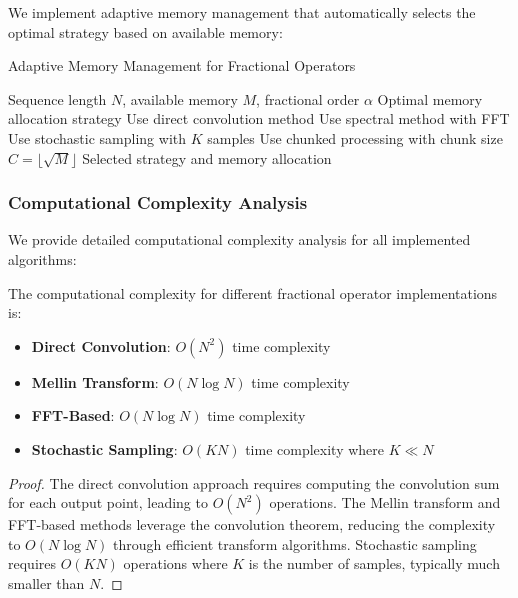 We implement adaptive memory management that automatically selects the optimal strategy based on available memory:

\begin{algorithm}[h]
\caption{Adaptive Memory Management for Fractional Operators}
\begin{algorithmic}[1]
\Require Sequence length $N$, available memory $M$, fractional order $\alpha$
\Ensure Optimal memory allocation strategy
    \State Use direct convolution method
    \State Use spectral method with FFT
    \State Use stochastic sampling with $K$ samples
\Else
    \State Use chunked processing with chunk size $C = \lfloor \sqrt{M} \rfloor$
\EndIf
\Return Selected strategy and memory allocation
\end{algorithmic}
\end{algorithm}

\subsubsection{Computational Complexity Analysis}

We provide detailed computational complexity analysis for all implemented algorithms:

\begin{theorem}
The computational complexity for different fractional operator implementations is:
\begin{itemize}
\item \textbf{Direct Convolution}: $O(N^2)$ time complexity
\item \textbf{Mellin Transform}: $O(N \log N)$ time complexity
\item \textbf{FFT-Based}: $O(N \log N)$ time complexity
\item \textbf{Stochastic Sampling}: $O(KN)$ time complexity where $K \ll N$
\end{itemize}
\end{theorem}

\begin{proof}
The direct convolution approach requires computing the convolution sum for each output point, leading to $O(N^2)$ operations. The Mellin transform and FFT-based methods leverage the convolution theorem, reducing the complexity to $O(N \log N)$ through efficient transform algorithms. Stochastic sampling requires $O(KN)$ operations where $K$ is the number of samples, typically much smaller than $N$.
\end{proof}

